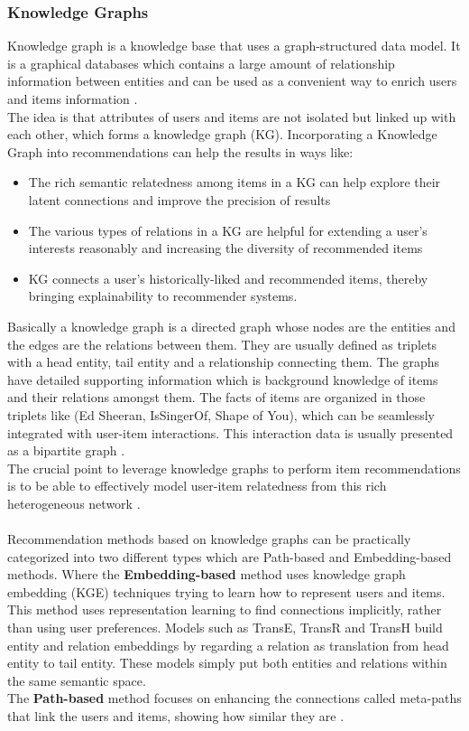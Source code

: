 \documentclass[\myFontSize,oneside,english,hidelinks,a4paper]{article}
\begin{document}
\subsubsection{Knowledge Graphs}
Knowledge graph is a knowledge base that uses a graph-structured data model. It is a graphical databases which contains a large amount of relationship information between entities and can be used as a convenient way to enrich users and items information \cite{Imene2022488}.\\
%
The idea is that attributes of users and items are not isolated but linked up with each other, which forms a knowledge graph (KG). Incorporating a Knowledge Graph into recommendations can help the results in ways like:
\begin{itemize}
\item The rich semantic relatedness among items in a KG can help explore their latent connections and improve the precision of results
\item The various types of relations in a KG are helpful for extending a user’s interests reasonably and increasing the diversity of recommended items
\item KG connects a user’s historically-liked and recommended items, thereby bringing explainability to recommender systems. \cite{Wang20193307}
\end{itemize}
%
Basically a knowledge graph is a directed graph whose nodes are the entities and the edges are the relations between them. They are usually defined as triplets with a head entity, tail entity and a relationship connecting them. The graphs have detailed supporting information which is background knowledge of items and their relations amongst them. The facts of items are organized in those triplets like (Ed Sheeran, IsSingerOf, Shape of You), which can be seamlessly integrated with user-item interactions. This interaction data is usually presented as a
bipartite graph \cite{pub.1120733877}. \\
The crucial point to leverage knowledge graphs to perform item recommendations is to be able to effectively model user-item relatedness from this rich heterogeneous network \cite{Palumbo201732}. \\\\ 
%
%
%
Recommendation methods based on knowledge graphs can be practically categorized into two different types which are Path-based and Embedding-based methods. Where the \textbf{Embedding-based} method uses knowledge graph embedding (KGE) techniques trying to learn how to represent users and items. This method uses representation learning to find connections implicitly, rather than using user preferences. Models such as TransE, TransR and TransH build entity and relation embeddings by regarding a relation as translation from head entity to tail entity. These models simply put both entities and relations within the same semantic space. \cite{pub.1148917041}\\
The \textbf{Path-based} method focuses on enhancing the connections called meta-paths that link the users and items, showing how similar they are \cite{Yang20229308}. \\
%
\end{document}
